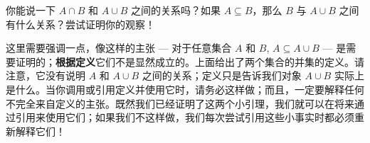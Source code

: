 你能说一下 $A \cap B$ 和 $A \cup B$ 之间的关系吗？如果 $A \subseteq B$，那么 $B$ 与 $A \cup B$ 之间有什么关系？尝试证明你的观察！

这里需要强调一点，像这样的主张 --- 对于任意集合 $A$ 和 $B$, $A \subseteq A \cup B$ --- 是需要证明的；\textbf{根据定义}它们不是显然成立的。上面给出了两个集合的并集的定义。请注意，它没有说明 $A$ 和 $A \cup B$ 之间的关系；定义只是告诉我们对象 $A \cup B$ 实际上是什么。当你调用或引用定义并使用它时，请务必这样做；而且，一定要解释任何不完全来自定义的主张。既然我们已经证明了这两个小引理，我们就可以在将来通过引用来使用它们；如果我们不这样做，我们每次尝试引用这些小事实时都必须重新解释它们！
